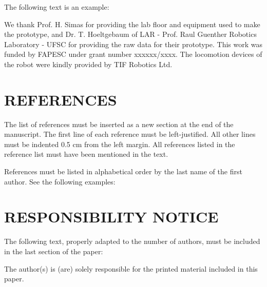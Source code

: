 \documentclass[10pt,fleqn,a4paper,twoside]{article}
\begin{document}
The following text is an example:

We thank Prof. H. Simas for providing the lab floor and equipment used to make the prototype, and Dr. T. Hoeltgebaum of LAR - Prof. Raul Guenther Robotics Laboratory - UFSC for providing the raw data for their prototype. This work was funded by FAPESC under grant number xxxxxx/xxxx. The locomotion devices of the robot were kindly provided by TIF Robotics Ltd. 

\section{REFERENCES} 
\label{Sec:references}

The list of references must be inserted as a new section at the end of the manuscript. The first line of each reference must be left-justified. All other lines must be indented 0.5 cm from the left margin. All references listed in the reference list must have been mentioned in the text.

References must be listed in alphabetical order by the last name of the first author. See the following examples:


\renewcommand{\refname}{}


\section{RESPONSIBILITY NOTICE}
The following text, properly adapted to the number of authors, must be included in the last section of the paper:

The author(s) is (are) solely responsible for the printed material included in this paper.
\end{document}
